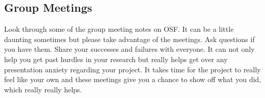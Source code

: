 \documentclass[prb,preprint]{revtex4-1}
\begin{document}
\subsection{Group Meetings}
Look through some of the group meeting notes on OSF. It can be a little daunting sometimes but please take advantage of the meetings. Ask questions if you have them. Share your successes and failures with everyone. It can not only help you get past hurdles in your research but really helps get over any presentation anxiety regarding your project. It takes time for the project to really feel like your own and these meetings give you a chance to show off what you did, which really really helps.

\end{document}
